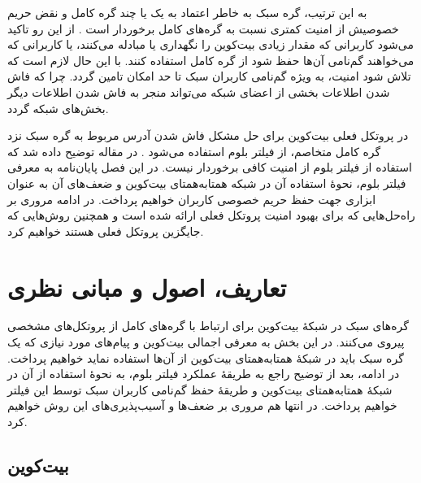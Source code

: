 به این ترتیب،‌ گره سبک به خاطر اعتماد به یک یا چند گره کامل و نقض حریم خصوصیش از امنیت کمتری نسبت به گره‌های کامل برخوردار است \cite{Sompolinsky2016}. از این رو تاکید می‌شود کاربرانی که مقدار زیادی بیت‌کوین را نگهداری یا مبادله می‌کنند، یا کاربرانی که می‌خواهند گم‌نامی آن‌ها حفظ شود از گره‌ کامل استفاده کنند. با این حال لازم است که تلاش شود امنیت، به ویژه گم‌نامی کاربران سبک تا حد امکان تامین گردد. چرا که فاش شدن اطلاعات بخشی از اعضای شبکه می‌تواند منجر به فاش شدن اطلاعات دیگر بخش‌های شبکه گردد.

در پروتکل فعلی بیت‌کوین برای حل مشکل فاش شدن آدرس مربوط به گره سبک نزد گره کامل متخاصم،  از فیلتر بلوم استفاده می‌شود \cite{Hearn2013}. در مقاله \cite{Gervais2014} توضیح داده ‌شد که استفاده از فیلتر بلوم از امنیت کافی برخوردار نیست. در این فصل پایان‌نامه به معرفی فیلتر بلوم، نحوهٔ استفاده آن در شبکه همتا‌به‌همتای بیت‌کوین و ضعف‌های آن به عنوان ابزاری جهت حفظ حریم خصوصی کاربران خواهیم پرداخت. در ادامه مروری بر راه‌حل‌هایی که برای بهبود امنیت پروتکل فعلی ارائه شده است و همچنین روش‌هایی که جایگزین پروتکل فعلی هستند خواهیم کرد.

\section{تعاریف، اصول و مبانی نظری}



گره‌های سبک در شبکهٔ بیت‌کوین برای ارتباط با گره‌های کامل از پروتکل‌های مشخصی پیروی می‌کنند. در این بخش به معرفی اجمالی بیت‌کوین و پیام‌های مورد نیازی که یک گره سبک باید در شبکهٔ همتا‌به‌همتای بیت‌کوین از آن‌ها استفاده نماید خواهیم پرداخت. در ادامه، بعد از توضیح راجع‌ به طریقهٔ عملکرد فیلتر بلوم، به نحوهٔ استفاده از آن در شبکهٔ همتا‌به‌همتای بیت‌کوین و طریقهٔ حفظ گم‌نامی کاربران سبک توسط این فیلتر خواهیم پرداخت. در انتها هم مروری بر ضعف‌ها و آسیب‌پذیری‌های این روش خواهیم کرد.
\subsection{بیت‌کوین}

